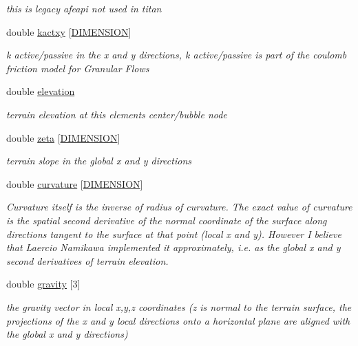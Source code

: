 \begin{CompactItemize}
\begin{CompactList}\small\item\em this is legacy afeapi not used in titan \item\end{CompactList}\item 
double \hyperlink{classElement_r36}{kactxy} \mbox{[}\hyperlink{constant_8h_a15}{DIMENSION}\mbox{]}
\begin{CompactList}\small\item\em k active/passive in the x and y directions, k active/passive is part of the coulomb friction model for Granular Flows \item\end{CompactList}\item 
double \hyperlink{classElement_r37}{elevation}
\begin{CompactList}\small\item\em terrain elevation at this elements center/bubble node \item\end{CompactList}\item 
double \hyperlink{classElement_r38}{zeta} \mbox{[}\hyperlink{constant_8h_a15}{DIMENSION}\mbox{]}
\begin{CompactList}\small\item\em terrain slope in the global x and y directions \item\end{CompactList}\item 
double \hyperlink{classElement_r39}{curvature} \mbox{[}\hyperlink{constant_8h_a15}{DIMENSION}\mbox{]}
\begin{CompactList}\small\item\em Curvature itself is the inverse of radius of curvature. The exact value of curvature is the spatial second derivative of the normal coordinate of the surface along directions tangent to the surface at that point (local x and y). However I believe that Laercio Namikawa implemented it approximately, i.e. as the global x and y second derivatives of terrain elevation. \item\end{CompactList}\item 
double \hyperlink{classElement_r40}{gravity} \mbox{[}3\mbox{]}
\begin{CompactList}\small\item\em the gravity vector in local x,y,z coordinates (z is normal to the terrain surface, the projections of the x and y local directions onto a horizontal plane are aligned with the global x and y directions) \item\end{CompactList}\item 

\end{CompactItemize}
